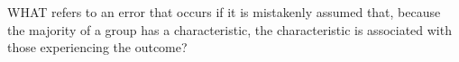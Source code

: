 WHAT refers to an error that occurs if it is mistakenly assumed that, because the majority of a group has a characteristic, the characteristic is associated with those experiencing the outcome?

\begin{MultipleChoice}[itemname=I-22]
\end{MultipleChoice}
